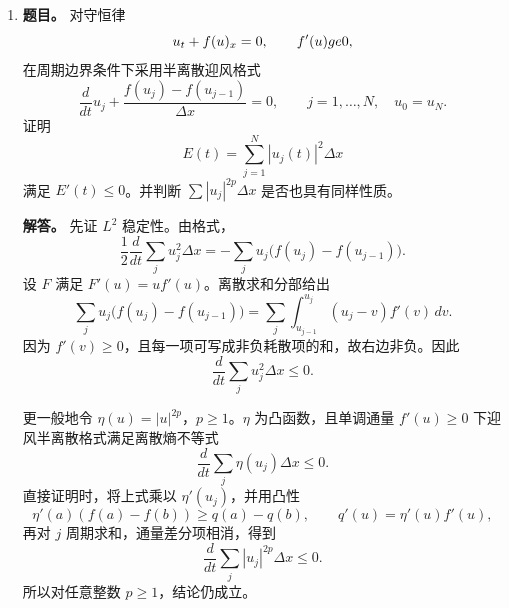 ﻿\documentclass[UTF8,12pt]{ctexart}
\begin{document}
\begin{enumerate}[label=\textbf{\arabic*.},leftmargin=2.2em]
\item \textbf{题目。} 对守恒律
\[
u_t+f(u)_x=0,
\qquad f'(u)\\ge0,
\]
在周期边界条件下采用半离散迎风格式
\[
\frac{d}{dt}u_j+\frac{f(u_j)-f(u_{j-1})}{\Delta x}=0,
\qquad j=1,\ldots,N,
\quad u_0=u_N.
\]
证明
\[
E(t)=\sum_{j=1}^N |u_j(t)|^2\Delta x
\]
满足 \(E'(t)\le0\)。并判断 \(\sum |u_j|^{2p}\Delta x\) 是否也具有同样性质。

\textbf{解答。} 先证 \(L^2\) 稳定性。由格式，
\[
\frac12\frac{d}{dt}\sum_j u_j^2\Delta x
=-\sum_j u_j\bigl(f(u_j)-f(u_{j-1})\bigr).
\]
设 \(F\) 满足 \(F'(u)=u f'(u)\)。离散求和分部给出
\[
\sum_j u_j\bigl(f(u_j)-f(u_{j-1})\bigr)
=\sum_j\int_{u_{j-1}}^{u_j}(u_j-v)f'(v)\,dv.
\]
因为 \(f'(v)\ge0\)，且每一项可写成非负耗散项的和，故右边非负。因此
\[
\frac{d}{dt}\sum_j u_j^2\Delta x\le0.
\]

更一般地令 \(\eta(u)=|u|^{2p}\)，\(p\ge1\)。\(\eta\) 为凸函数，且单调通量 \(f'(u)\ge0\) 下迎风半离散格式满足离散熵不等式
\[
\frac{d}{dt}\sum_j \eta(u_j)\Delta x\le0.
\]
直接证明时，将上式乘以 \(\eta'(u_j)\)，并用凸性
\[
\eta'(a)(f(a)-f(b))\ge q(a)-q(b),
\qquad q'(u)=\eta'(u)f'(u),
\]
再对 \(j\) 周期求和，通量差分项相消，得到
\[
\frac{d}{dt}\sum_j |u_j|^{2p}\Delta x\le0.
\]
所以对任意整数 \(p\ge1\)，结论仍成立。
\end{enumerate}
\end{document}

